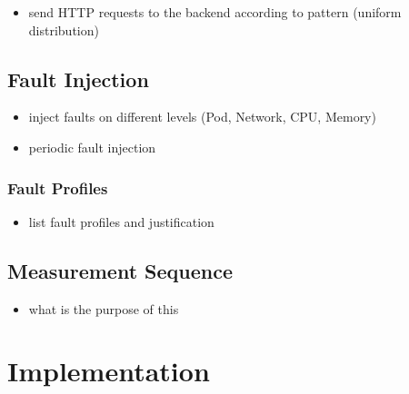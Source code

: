 \begin{itemize}
	\item send HTTP requests to the backend according to pattern (uniform distribution)
\end{itemize}


\subsection{Fault Injection}

\begin{itemize}
	\item inject faults on different levels (Pod, Network, CPU, Memory)
	\item periodic fault injection
\end{itemize}


\subsubsection{Fault Profiles}

\begin{itemize}
	\item list fault profiles and justification
\end{itemize}

\subsection{Measurement Sequence}

\begin{itemize}
	\item what is the purpose of this
\end{itemize}

\section{Implementation}

